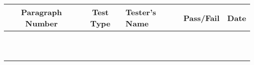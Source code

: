 \begin{table}[h]
\centering
\begin{tabular}{|c|c|C{6cm}|c|c|}
\hline
\textbf{Paragraph Number} & \textbf{Test Type}& 
\textbf{Tester's Name} & \textbf{Pass/Fail} & \textbf{Date} \\
\hline
 & & & & \\
\hline
 & & & & \\
\hline
 & & & & \\
\hline
 & & & & \\
\hline
 & & & & \\
\hline
 & & & & \\
\hline
 & & & & \\
\hline
 & & & & \\
\hline
 & & & & \\
\hline
 & & & & \\
\hline
\end{tabular}
\end{table}

